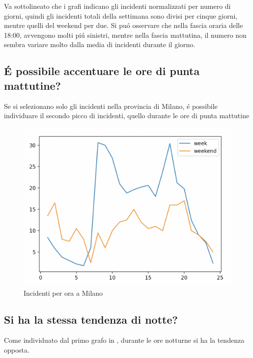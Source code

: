 \documentclass[a4paper]{report}
\begin{document}
Va sottolineato che i grafi indicano gli incidenti normalizzati per numero di 
giorni, 
quindi gli incidenti totali della settimana sono divisi per cinque giorni, 
mentre quelli del weekend per due.
Si pu\'o osservare che nella fascia oraria delle 18:00, 
avvengono molti pi\'u sinistri, mentre nella fascia mattutina, 
il numero non sembra variare molto dalla media di incidenti durante il giorno.

\newpage
\subsection{\'E possibile accentuare le ore di punta mattutine?}

Se si selezionano solo gli incidenti nella provincia di Milano, \'e possibile individuare 
il secondo picco di incidenti, quello durante le ore di punta mattutine

\begin{figure}[!ht]
    \includegraphics[width=\linewidth]{../src/incidenti/incidenti_senza_coords/ore_punta/week_weekend_milano.png}
    \caption{Incidenti per ora a Milano}
    \label{fig:week_weekend_milano}
\end{figure}


\newpage
\subsection{Si ha la stessa tendenza di notte?}

Come individuato dal primo grafo in \label{fig:week_weekend}, durante le 
ore notturne si ha la tendenza opposta.
\end{document}
